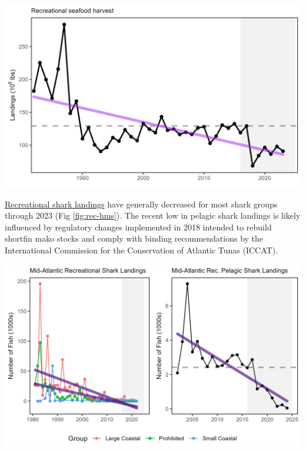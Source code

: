 \documentclass[
  10pt,
]{article}
\let\origfigure\figure
\let\endorigfigure\endfigure
\renewenvironment{figure}[1][2] {
    \expandafter\origfigure\expandafter[H]
} {
    \endorigfigure
}
\begin{document}
\begin{figure}

{\centering \includegraphics[width=6.5in]{images/MidAtlantic/rec_landings_MidAtlantic_2025-09-05} 

}

\caption{Total recreational seafood harvest (millions of pounds, black, significant decrease, purple) in the Mid-Atlantic region.}\label{fig:rec-landings}
\end{figure}

\href{https://noaa-edab.github.io/catalog/rec_hms.html}{Recreational shark landings} have generally decreased for most shark groups through 2023 (Fig \ref{fig:rec-hms}). The recent low in pelagic shark landings is likely influenced by regulatory changes implemented in 2018 intended to rebuild shortfin mako stocks and comply with binding recommendations by the International Commission for the Conservation of Atlantic Tunas (ICCAT).

\begin{figure}

{\centering \includegraphics[width=6.5in]{images/MidAtlantic/rec_hms_MidAtlantic_2025-09-05} 

}

\caption{Recreational shark landings from Marine Recreational Information Program (left) and Large Pelagics Survey (right) with declining trends (purple).}\label{fig:rec-hms}
\end{figure}
\end{document}
